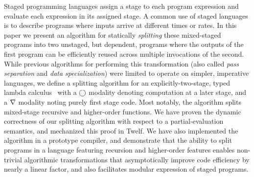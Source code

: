 
Staged programming languages assign a stage to each program expression
and evaluate each expression in its assigned stage. A common use of
staged languages is to describe programs where inputs arrive at
different times or rates. In this paper we present an algorithm for
statically {\em splitting} these mixed-staged programs into two
unstaged, but dependent, programs where the outputs of the first
program can be efficiently reused across multiple invocations of the
second. While previous algorithms for performing this transformation
(also called \emph{pass separation} and \emph{data specialization})
were limited to operate on simpler, imperative languages, we define a
splitting algorithm for an explicitly-two-stage, typed lambda
calculus \lang\ with a $\bigcirc$ modality denoting computation at a later
stage, and a $\nabla$ modality noting purely first stage code.  Most
notably, the algorithm splits mixed-stage recursive and higher-order
functions.  We have proven the dynamic correctness of our splitting
algorithm with respect to a partial-evaluation semantics, and
mechanized this proof in Twelf. We have also implemented the algorithm
in a prototype compiler, and demonstrate that the ability to split
programs in a language featuring recursion and higher-order features
enables non-trivial algorithmic transformations that asymptotically
improve code efficiency by nearly a linear factor, and also
facilitates modular expression of staged programs.
